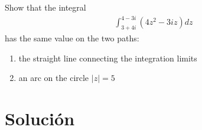 \begin{problem}{3}
    Show that the integral 
    \begin{gather*}
        \int_{3+4i}^{4-3i}(4z^2 - 3iz)dz 
    \end{gather*}
    has the same value on the two paths:
    \begin{enumerate}
        \item the straight line connecting the integration limits
        \item an arc on the circle $|z| = 5$
    \end{enumerate}
\end{problem}

\section*{Solución}

